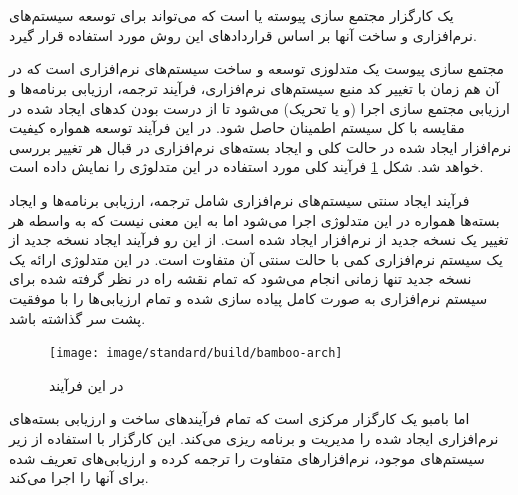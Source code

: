 %
% 
% 
% 
%
\section{}

 یک کارگزار مجتمع سازی پیوسته یا
 است که می‌تواند برای توسعه سیستم‌های نرم‌افزاری و ساخت آنها بر اساس
قراردادهای این روش مورد استفاده قرار گیرد.

مجتمع سازی پیوست یک متدلوزی توسعه و ساخت سیستم‌های نرم‌افزاری است که در آن 
هم زمان با تغییر کد منبع سیستم‌های نرم‌افزاری، فرآیند ترجمه، ارزیابی
برنامه‌ها و ارزیابی مجتمع سازی اجرا (و یا تحریک) می‌شود تا از درست بودن کدهای
ایجاد شده در مقایسه با کل سیستم اطمینان حاصل شود. در این فرآیند توسعه همواره
کیفیت نرم‌افزار ایجاد شده در حالت کلی و ایجاد بسته‌های نرم‌افزاری در قبال هر
تغییر بررسی خواهد شد. شکل \ref{image/standard/build/bamboo-arch} فرآیند کلی مورد
استفاده در این متدلوژی را نمایش داده است.

فرآیند ایجاد سنتی سیستم‌های نرم‌افزاری شامل ترجمه، ارزیابی برنامه‌ها و ایجاد
بسته‌ها همواره در این متدلوژی اجرا می‌شود اما به این معنی نیست که به واسطه هر
تغییر یک نسخه جدید از نرم‌افزار ایجاد شده است. از این رو فرآیند ایجاد نسخه جدید
از یک سیستم نرم‌افزاری کمی با حالت سنتی آن متفاوت است. در این متدلوژی ارائه یک
نسخه جدید تنها زمانی انجام می‌شود که تمام نقشه راه در نظر گرفته شده برای سیستم
نرم‌افزاری به صورت کامل پیاده سازی شده و تمام ارزیابی‌ها را با موفقیت پشت
سر گذاشته باشد.

\begin{figure}
\centering
\texttt{[image: image/standard/build/bamboo-arch]}
\caption[فرآیند مجتمع سازی پیوسته یا ]{
	در این فرآيند
}
\label{image/standard/build/bamboo-arch}
\end{figure}



اما بامبو یک کارگزار مرکزی است که تمام فرآیندهای ساخت و ارزیابی بسته‌های
نرم‌افزاری ایجاد شده را مدیریت و برنامه ریزی می‌کند. این کارگزار با استفاده از
زیر سیستم‌های موجود، نرم‌افزارهای متفاوت را ترجمه کرده و ارزیابی‌های تعریف شده
برای آنها را اجرا می‌کند.

